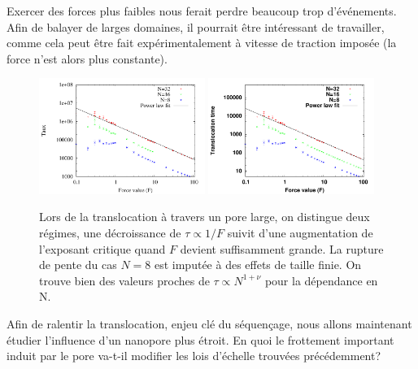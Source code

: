 \documentclass[a4paper,11pt]{article}
\begin{document}
Exercer des forces plus faibles nous ferait perdre beaucoup trop d'événements. Afin de balayer de larges domaines, il pourrait être intéressant de travailler, comme cela peut être fait expérimentalement à vitesse de traction imposée (la force n'est alors plus constante).

\begin{figure}[H]
\begin{center}
\includegraphics[width=0.48\textwidth]{translocfholebigger.pdf} \includegraphics[width=0.48\textwidth]{translocholebigger.pdf}

\caption{Lors de la translocation à travers un pore large, on distingue deux régimes, une décroissance de $\tau \propto 1/F$ suivit d'une augmentation de l'exposant critique quand $F$ devient suffisamment grande. La rupture de pente du cas $N=8$ est imputée à des effets de taille finie. On trouve bien des valeurs proches de $\tau \propto N^{1+\nu}$ pour la dépendance en N.}
\label{holebigger}
\end{center}
\end{figure}

Afin de ralentir la translocation, enjeu clé du séquençage, nous allons maintenant étudier l'influence d'un nanopore plus étroit. En quoi le frottement important induit par le pore va-t-il modifier les lois d'échelle trouvées précédemment?
\end{document}
